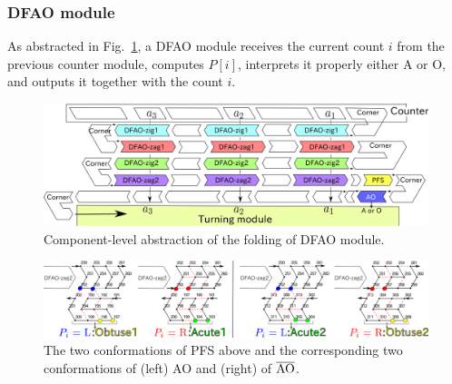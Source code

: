 			\subsubsection{DFAO module}


As abstracted in Fig.~\ref{fig:abst_dfao}, a DFAO module receives the current count $i$ from the previous counter module, computes $P[i]$, interprets it properly either A or O, and outputs it together with the count $i$. 

\begin{figure}[tp]
\includegraphics[width=\linewidth]{pic/abst_DFAO.png}
\caption{Component-level abstraction of the folding of DFAO module.}
\label{fig:abst_dfao}
\end{figure}


\begin{figure}[h]
\includegraphics[width=\linewidth]{pic/PFS.png}
\caption{The two conformations of PFS above and the corresponding two conformations of (left) AO and (right) of $\overline{\rm AO}$.}
\label{fig:PFS}
\end{figure}

